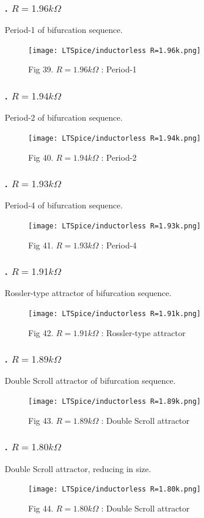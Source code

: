 \documentclass[12pt]{article}
\begin{document}
\subsubsection*{. $R=1.96k\Omega$}
Period-1 of bifurcation sequence.
\begin{figure}[H] %
	\centering
	\texttt{[image: LTSpice/inductorless R=1.96k.png]}
	\caption{Fig 39. $R=1.96k\Omega$ : Period-1}
\end{figure}
\subsubsection*{. $R=1.94k\Omega$}
Period-2 of bifurcation sequence.
\begin{figure}[H] %
	\centering
	\texttt{[image: LTSpice/inductorless R=1.94k.png]}
	\caption{Fig 40. $R=1.94k\Omega$ : Period-2}
\end{figure}
\subsubsection*{. $R=1.93k\Omega$}
Period-4 of bifurcation sequence.
\begin{figure}[H] %
	\centering
	\texttt{[image: LTSpice/inductorless R=1.93k.png]}
	\caption{Fig 41. $R=1.93k\Omega$ : Period-4}
\end{figure}
\subsubsection*{. $R=1.91k\Omega$}
Rossler-type attractor of bifurcation sequence.
\begin{figure}[H] %
	\centering
	\texttt{[image: LTSpice/inductorless R=1.91k.png]}
	\caption{Fig 42. $R=1.91k\Omega$ : Rossler-type attractor}
\end{figure}
\subsubsection*{. $R=1.89k\Omega$}
Double Scroll attractor of bifurcation sequence.
\begin{figure}[H] %
	\centering
	\texttt{[image: LTSpice/inductorless R=1.89k.png]}
	\caption{Fig 43. $R=1.89k\Omega$ : Double Scroll attractor}
\end{figure}
\subsubsection*{. $R=1.80k\Omega$}
Double Scroll attractor, reducing in size.
\begin{figure}[H] %
	\centering
	\texttt{[image: LTSpice/inductorless R=1.80k.png]}
	\caption{Fig 44. $R=1.80k\Omega$ : Double Scroll attractor}
\end{figure}
\end{document}
